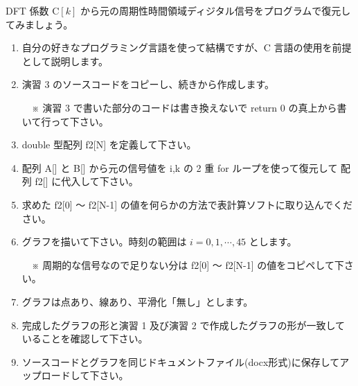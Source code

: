 \documentclass[a4paper]{jarticle}
\begin{document}
 DFT 係数 $\textrm{C}[k]$ から元の周期性時間領域ディジタル信号をプログラムで復元してみましょう。\par
\par\vspace{1zh}
\begin{enumerate}
\item 自分の好きなプログラミング言語を使って結構ですが、C 言語の使用を前提として説明します。
\item 演習 3 のソースコードをコピーし、続きから作成します。\par
　※ 演習 3 で書いた部分のコードは書き換えないで return 0 の真上から書いて行って下さい。
\item double 型配列 f2[N] を定義して下さい。
\item 配列 A[] と B[] から元の信号値を i,k の 2 重 for ループを使って復元して 配列 f2[] に代入して下さい。
\item 求めた f2[0] 〜 f2[N-1] の値を何らかの方法で表計算ソフトに取り込んでください。
\item グラフを描いて下さい。時刻の範囲は $i = 0, 1,  \cdots, 45$ とします。\par
　※ 周期的な信号なので足りない分は f2[0] 〜 f2[N-1] の値をコピペして下さい。
\item グラフは点あり、線あり、平滑化「無し」とします。
\item 完成したグラフの形と演習 1 及び演習 2 で作成したグラフの形が一致していることを確認して下さい。
\item ソースコードとグラフを同じドキュメントファイル(docx形式)に保存してアップロードして下さい。
\end{enumerate}

\end{document}
